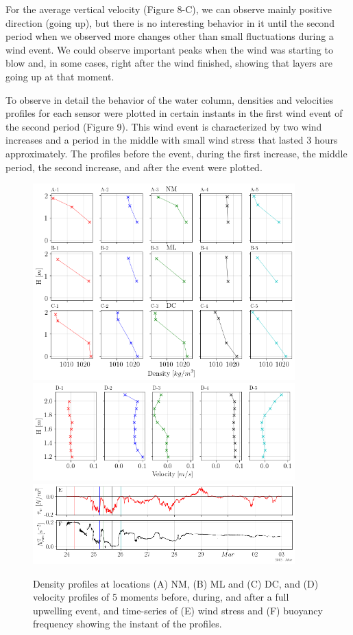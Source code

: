 \documentclass[tesis.tex]{subfiles}
\begin{document}
    For the average vertical velocity (Figure 8-C), we can observe mainly positive direction (going up), but there is no interesting behavior in it until the second period when we observed more changes other than small fluctuations during a wind event. We could observe important peaks when the wind was starting to blow and, in some cases, right after the wind finished, showing that layers are going up at that moment.
    
    To observe in detail the behavior of the water column, densities and velocities profiles for each sensor were plotted in certain instants in the first wind event of the second period (Figure 9). This wind event is characterized by two wind increases and a period in the middle with small wind stress that lasted 3 hours approximately. The profiles before the event, during the first increase, the middle period, the second increase, and after the event were plotted.

    \begin{figure}[h!]
      \centering
      \includegraphics[width=0.9\textwidth]{Imagenes/perf.png}
      \includegraphics[width=0.9\textwidth]{Imagenes/vel.png}
      \includegraphics[width=0.9\textwidth]{Imagenes/n2.png}
      \caption{Density profiles at locations (A) NM, (B) ML and (C) DC, and (D) velocity profiles of 5 moments before, during, and after a full upwelling event, and time-series of (E) wind stress and (F) buoyancy frequency showing the instant of the profiles.}
      \label{fig:perfiles2}
    \end{figure}
    
\end{document}
